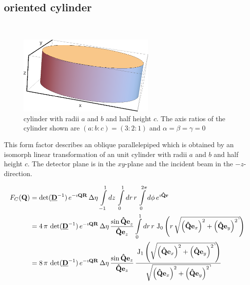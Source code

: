 \subsection{oriented cylinder} ~\\

\begin{figure}[htb]
\begin{center}
\includegraphics[width=0.6\textwidth]{../images/form_factor/supershapes/cylinder321.png}
\end{center}
\caption{cylinder with radii $a$ and $b$ and half height $c$. The axis ratios of the cylinder shown are $(a:b:c)=(3:2:1)$ and $\alpha=\beta=\gamma=0$}
\label{fig:opo_cylinder}
\end{figure}

This form factor describes an oblique parallelepiped which is obtained by an isomorph linear transformation of an unit cylinder with radii $a$ and $b$ and half height $c$. The detector plane is in the $xy$-plane and the incident beam in the $-z$-direction.


\begin{align}
F_C(\B{Q}) &=
\det(\M{D}^{-1})\, e^{-\imath\B{QR}}\, \Delta\eta\, \int\limits_{-1}^1
dz\, \int\limits_{0}^{1} dr\, r\, \int\limits_{0}^{2\pi} d\phi \,
e^{\imath\B{\hat{Q}r}} \nonumber \\
&=
4\, \pi\, \det(\M{D}^{-1})\, e^{-\imath\B{QR}}\, \Delta\eta\,
\frac{\sin\B{\hat{Q}e}_z}{\B{\hat{Q}e}_z}
\int\limits_{0}^1 dr\,r\,
\U{J}_0\left(r\, \sqrt{\left(\B{\hat{Q}}\B{e}_x\right)^2+
\left(\B{\hat{Q}}\B{e}_y\right)^2}\right)
\nonumber \\
&= \displaystyle
8\, \pi\,\det(\M{D}^{-1})\, e^{-\imath\B{QR}}\,
\Delta\eta\, \frac{\sin\B{\hat{Q}}\B{e}_z}{\B{\hat{Q}}\B{e}_z}
\, \frac{\U{J}_1\left(\sqrt{\left(\B{\hat{Q}}\B{e}_x\right)^2+
\left(\B{\hat{Q}}\B{e}_y\right)^2}\right)}{\sqrt{
\left(\B{\hat{Q}}\B{e}_x\right)^2+\left(\B{\hat{Q}}\B{e}_y\right)^2}}
\label{eq:form:C}
\end{align}

